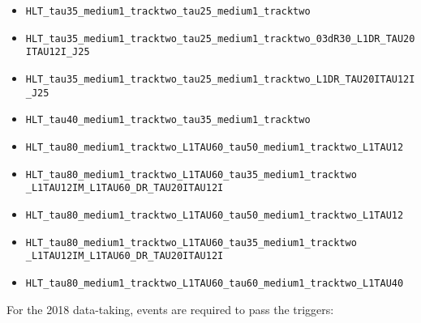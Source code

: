 \begin{itemize}
  \item \texttt{HLT\_tau35\_medium1\_tracktwo\_tau25\_medium1\_tracktwo}

  \item \texttt{HLT\_tau35\_medium1\_tracktwo\_tau25\_medium1\_tracktwo\_03dR30\_L1DR\_TAU20ITAU12I\_J25}

  \item \texttt{HLT\_tau35\_medium1\_tracktwo\_tau25\_medium1\_tracktwo\_L1DR\_TAU20ITAU12I\_J25}

  \item \texttt{HLT\_tau40\_medium1\_tracktwo\_tau35\_medium1\_tracktwo}

  \item \texttt{HLT\_tau80\_medium1\_tracktwo\_L1TAU60\_tau50\_medium1\_tracktwo\_L1TAU12}

  \item \texttt{HLT\_tau80\_medium1\_tracktwo\_L1TAU60\_tau35\_medium1\_tracktwo\\\_L1TAU12IM\_L1TAU60\_DR\_TAU20ITAU12I}

  \item \texttt{HLT\_tau80\_medium1\_tracktwo\_L1TAU60\_tau50\_medium1\_tracktwo\_L1TAU12}

  \item \texttt{HLT\_tau80\_medium1\_tracktwo\_L1TAU60\_tau35\_medium1\_tracktwo\\\_L1TAU12IM\_L1TAU60\_DR\_TAU20ITAU12I}

  \item \texttt{HLT\_tau80\_medium1\_tracktwo\_L1TAU60\_tau60\_medium1\_tracktwo\_L1TAU40}
\end{itemize}

For the 2018 data-taking, events are required to pass the triggers:

